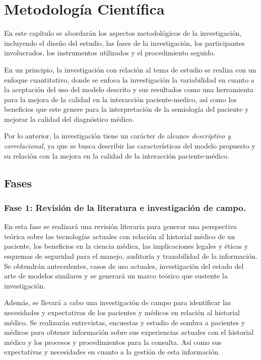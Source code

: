 \section{Metodología Científica}

En este capítulo se abordarán los aspectos metodológicos de la investigación, incluyendo el diseño del estudio, las fases de la investigación, los participantes involucrados, los instrumentos utilizados y el procedimiento seguido.

En un principio, la investigación con relación al tema de estudio se realiza con un enfoque cuantitativo, donde se enfoca la investigación la variabilidad en cuanto a la aceptación del uso del modelo descrito y sus resultados como una herramienta para la mejora de la calidad en la interacción paciente-medico, así como los beneficios que este genere para la interpretación de la semiología del paciente y mejorar la calidad del diagnóstico médico.

Por lo anterior, la investigación tiene un carácter de alcance \textit{descriptivo y correlacional}, ya que se busca describir las características del modelo propuesto y su relación con la mejora en la calidad de la interacción paciente-médico.

    \subsection{Fases}
    \subsubsection{Fase 1: Revisión de la literatura e investigación de campo.}
    En esta fase se realizará una revisión literaria para generar una perspectiva teórica sobre las tecnologías actuales con relación al historial médico de un paciente, los beneficios en la ciencia médica, las implicaciones legales y éticas y esquemas de seguridad para el manejo, auditoría y trazabilidad de la información. Se obtendrán antecedentes, casos de uso actuales, investigación del estado del arte de modelos similares y se generará un marco teórico que sustente la investigación.

    Además, se llevará a cabo una investigación de campo para identificar las necesidades y expectativas de los pacientes y médicos en relación al historial médico. Se realizarán entrevistas, encuestas y estudio de sombra a pacientes y médicos para obtener información sobre sus experiencias actuales con el historial médico y los procesos y procedimientos para la consulta. Así como sus expectativas y necesidades en cuanto a la gestión de esta información.
